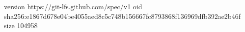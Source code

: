 version https://git-lfs.github.com/spec/v1
oid sha256:e1867d678e04be4055aed8c5c748b156667fc8793868f136969dfb392ae2b46f
size 104958
